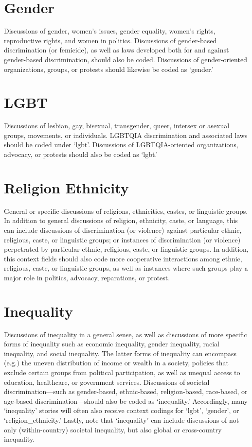 \documentclass[11pt]{report}
\begin{document}
\section{Gender}\label{context:gender}

Discussions of gender, women's issues, gender equality, women's rights, reproductive rights, and women in politics. Discussions of gender-based discrimination (or femicide), as well as laws developed both for and against gender-based discrimination, should also be coded. Discussions of gender-oriented organizations, groups, or protests should likewise be coded as `gender.'

\section{LGBT}\label{context:lgbt}

Discussions of lesbian, gay, bisexual, transgender, queer, intersex or asexual groups, movements, or individuals. LGBTQIA discrimination and associated laws should be coded under `lgbt'. Discussions of LGBTQIA-oriented organizations, advocacy, or protests should also be coded as `lgbt.'

\section{Religion Ethnicity}\label{context:religethno}
General or specific discussions of religions, ethnicities, castes, or linguistic groups. In addition to general discussions of religion, ethnicity, caste, or language, this can include discussions of discrimination (or violence) against particular ethnic, religious, caste, or linguistic groups; or instances of discrimination (or violence) perpetrated by particular ethnic, religious, caste, or linguistic groups. In addition, this context fields should also code more cooperative interactions among ethnic, religious, caste, or linguistic groups, as well as instances where such groups play a major role in politics, advocacy, reparations, or protest.

\section{Inequality}\label{context:inequality}
Discussions of inequality in a general sense, as well as discussions of more specific forms of inequality such as economic inequality, gender inequality, racial inequality, and social inequality. The latter forms of inequality can encompass (e.g.) the uneven distribution of income or wealth in a society, policies that exclude certain groups from political participation, as well as unequal access to education, healthcare, or government services. Discussions of societal discrimination---such as gender-based, ethnic-based, religion-based, race-based, or age-based discrimination---should also be coded as `inequality.' Accordingly, many `inequality' stories will often also receive context codings for `lgbt', `gender', or `religion\_ethnicity.' Lastly, note that `inequality' can include discussions of not only (within-country) societal inequality, but also global or cross-country inequality.
\end{document}
